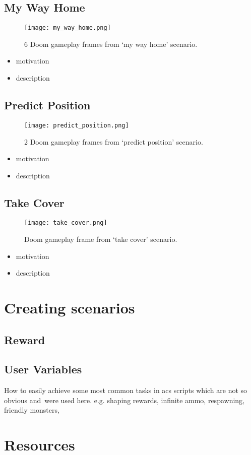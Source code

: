 \newpage
\subsection{My Way Home}
	\begin{figure}
		\centering
		\texttt{[image: my\_way\_home.png]}
		\caption{6 Doom gameplay frames from `my way home' scenario.}\label{fig:my_way_home}
	\end{figure}
\begin{itemize}
	\item motivation
	\item description
\end{itemize}

\newpage
\subsection{Predict Position}
	\begin{figure}
		\centering
		\texttt{[image: predict\_position.png]}
		\caption{2 Doom gameplay frames from `predict position' scenario.}\label{fig:predict_position}
	\end{figure}
\begin{itemize}
	\item motivation
	\item description
\end{itemize}

\newpage
\subsection{Take Cover}
	\begin{figure}
		\centering
		\texttt{[image: take\_cover.png]}
		\caption{Doom gameplay frame from `take cover' scenario.}
	\end{figure}
\begin{itemize}
	\item motivation
	\item description
\end{itemize}



\section{Creating scenarios}\label{sec:creating_scenarios}
\subsection{Reward}
\subsection{User Variables}
How to easily achieve some most common tasks in acs scripts which are not so obvious and~were used here.
e.g. shaping rewards, infinite ammo, respawning, friendly monsters, 

\section{Resources}